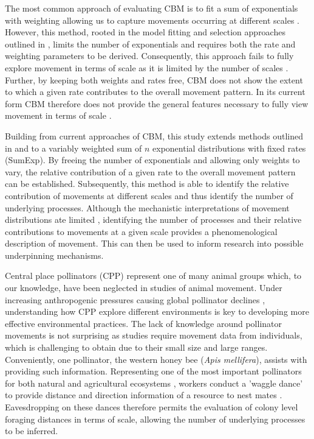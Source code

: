 \documentclass[11pt,usenames,dvipsnames,a4paper]{article}
\begin{document}
\begin{linenumbers}
The most common approach of evaluating CBM is to fit a sum of exponentials with weighting allowing us to capture movements occurring at different scales \citep{Jansen2012, DeJager2013, Kolzsch2015, Wosniack2017}. However, this method, rooted in the model fitting and selection approaches outlined in \cite{Murphy2007}, limits the number of exponentials and requires both the rate and weighting parameters to be derived. Consequently, this approach fails to fully explore movement in terms of scale as it is limited by the number of scales \citep{Jansen2012}. Further, by keeping both weights and rates free, CBM does not show the extent to which a given rate contributes to the overall movement pattern. In its current form CBM therefore does not provide the general features necessary to fully view movement in terms of scale \citep{Nathan2008, Patterson2017}. 

Building from current approaches of CBM, this study extends methods outlined in \cite{Petrovskii2011} and \cite{Jansen2012} to a variably weighted sum of $n$ exponential distributions with fixed rates (SumExp). By freeing the number of exponentials and allowing only weights to vary, the relative contribution of a given rate to the overall movement pattern can be established. Subsequently, this method is able to identify the relative contribution of movements at different scales and thus identify the number of underlying processes. Although the mechanistic interpretations of movement distributions ate limited \citep{Bearup2016}, identifying the number of processes and their relative contributions to movements at a given scale provides a phenomenological description of movement. This can then be used to inform research into possible underpinning mechanisms. 

Central place pollinators (CPP) represent one of many animal groups which, to our knowledge, have been neglected in studies of animal movement. Under increasing anthropogenic pressures causing global pollinator declines \citep{Powney2019}, understanding how CPP explore different environments is key to developing more effective environmental practices. The lack of knowledge around pollinator movements is not surprising as studies require movement data from individuals, which is challenging to obtain due to their small size and large ranges. Conveniently, one pollinator, the western honey bee (\textit{Apis mellifera}), assists with providing such information. Representing one of the most important pollinators for both natural and agricultural ecosystems \citep{Albrecht2018}, workers conduct a 'waggle dance' to provide distance and direction information of a resource to nest mates \citep{Seeley1995}. Eavesdropping on these dances therefore permits the evaluation of colony level foraging distances in terms of scale, allowing the number of underlying processes to be inferred.


\end{linenumbers}
\end{document}
